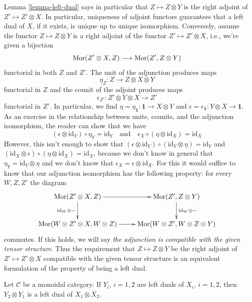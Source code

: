 \begin{remark}
\label{remark-left-dual-adjoint}
Lemma \ref{lemma-left-dual} says in particular that $Z \mapsto Z \otimes Y$
is the right adjoint of $Z' \mapsto Z' \otimes X$. In particular, uniqueness
of adjoint functors guarantees that a left dual of $X$, if it exists, is
unique up to unique isomorphism.
Conversely, assume the functor $Z \mapsto Z \otimes Y$ is a right adjoint of
the functor $Z' \mapsto Z' \otimes X$, i.e., we're given a bijection
$$
\mathop{\mathrm{Mor}}\nolimits(Z' \otimes X, Z) \longrightarrow \mathop{\mathrm{Mor}}\nolimits(Z', Z \otimes Y)
$$
functorial in both $Z$ and $Z'$. The unit of the adjunction produces
maps
$$
\eta_Z : Z \to Z \otimes X \otimes Y
$$
functorial in $Z$ and the counit of the adjoint produces maps
$$
\epsilon_{Z'} : Z' \otimes Y \otimes X \to Z'
$$
functorial in $Z'$. In particular, we find
$\eta = \eta_\mathbf{1} : \mathbf{1} \to X \otimes Y$ and
$\epsilon = \epsilon_\mathbf{1} : Y \otimes X \to \mathbf{1}$.
As an exercise in the relationship between units, counits, and
the adjunction isomorphism, the reader can show that we have
$$
(\epsilon \otimes \text{id}_Y) \circ \eta_Y = \text{id}_Y
\quad\text{and}\quad
\epsilon_X \circ (\eta \otimes \text{id}_X) = \text{id}_X
$$
However, this isn't enough to show that
$(\epsilon \otimes \text{id}_Y) \circ (\text{id}_Y \otimes \eta) =
\text{id}_Y$ and
$(\text{id}_X \otimes \epsilon) \circ (\eta \otimes \text{id}_X) =
\text{id}_X$, because we don't know in general that
$\eta_Y = \text{id}_Y \otimes \eta$ and we don't know that
$\epsilon_X = \epsilon \otimes \text{id}_X$. For this it would suffice
to know that our adjunction isomorphism has the following property:
for every $W, Z, Z'$ the diagram
$$
\xymatrix{
\Mor(Z' \otimes X, Z) \ar[r] \ar[d]_{\text{id}_W \otimes -} &
\Mor(Z', Z \otimes Y) \ar[d]^{\text{id}_W \otimes -} \\
\Mor(W \otimes Z' \otimes X, W \otimes Z) \ar[r] &
\Mor(W \otimes Z', W \otimes Z \otimes Y)
}
$$
commutes.
If this holds, we will say {\it the adjunction is compatible with
the given tensor structure}. Thus the requirement that
$Z \mapsto Z \otimes Y$ be the right adjoint of $Z' \mapsto Z' \otimes X$
compatible with the given tensor structure is an equivalent formulation of the
property of being a left dual.
\end{remark}

\begin{lemma}
\label{lemma-tensor-dual}
Let $\mathcal{C}$ be a monoidal category. If $Y_i$, $i = 1, 2$
are left duals of $X_i$, $i = 1, 2$, then $Y_2 \otimes Y_1$ is
a left dual of $X_1 \otimes X_2$.
\end{lemma}

